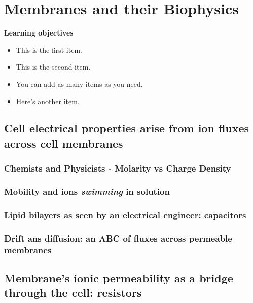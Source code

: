 \chapter{Membranes and their Biophysics}
\label{biophys} %


\vspace{2cm} %

\begin{svgraybox}
{\bf{Learning objectives}}
\begin{itemize}
	\item This is the first item.
	\item This is the second item.
	\item You can add as many items as you need.
	\item Here's another item.
  \end{itemize}
\end{svgraybox}

\clearpage


\section{Cell electrical properties arise from ion fluxes across cell membranes}

\subsection{Chemists and Physicists - Molarity vs Charge Density}

\subsection{Mobility and ions \textit{swimming} in solution}


\subsection{Lipid bilayers as seen by an electrical engineer: capacitors}

\subsection{Drift ans diffusion: an ABC of fluxes across permeable membranes}

\section{Membrane’s ionic permeability as a bridge through the cell: resistors}

